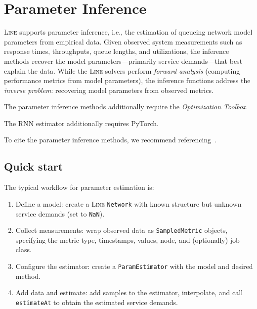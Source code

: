 \chapter{Parameter Inference}
\label{parameter-inference}

\textsc{Line} supports parameter inference, i.e., the estimation of queueing network model parameters from empirical data. Given observed system measurements such as response times, throughputs, queue lengths, and utilizations, the inference methods recover the model parameters---primarily service demands---that best explain the data. While the \textsc{Line} solvers perform {\em forward analysis} (computing performance metrics from model parameters), the inference functions address the {\em inverse problem}: recovering model parameters from observed metrics.

\begin{MATLAB}
\noindent The parameter inference methods additionally require the \emph{Optimization Toolbox}.
\end{MATLAB}
\begin{PYTHON}
\noindent The RNN estimator additionally requires PyTorch.
\end{PYTHON}

\noindent To cite the parameter inference methods, we recommend referencing~\cite{SpinnerCBK15,LiuHCA06,PerezCPS15,WangCS16,WangCKN16,GarbiIT20}.

\section{Quick start}
\label{infer-quick-start}

The typical workflow for parameter estimation is:
\begin{enumerate}
\item Define a model: create a \textsc{Line} \texttt{Network} with known structure but unknown service demands (set to \texttt{NaN}).
\item Collect measurements: wrap observed data as \texttt{SampledMetric} objects, specifying the metric type, timestamps, values, node, and (optionally) job class.
\item Configure the estimator: create a \texttt{ParamEstimator} with the model and desired method.
\item Add data and estimate: add samples to the estimator, interpolate, and call \texttt{estimateAt} to obtain the estimated service demands.
\end{enumerate}

